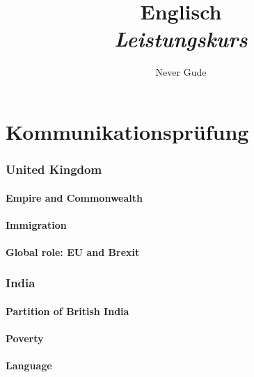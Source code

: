 \documentclass[10pt]{article}
\begin{document}
\title{{Englisch}\\{\normalsize{\itshape Leistungskurs}}}
	\author{Never Gude}
	\maketitle
	\newpage
	\pagestyle{fancynotes}

\part{Kommunikationsprüfung}
	\label{part:kompruef}
\section{United Kingdom}
	\label{sec:uk}
\subsection{Empire and Commonwealth}
	\label{ssec:uk@empire}
\subsection{Immigration}
	\label{ssec:uk@immig}
\subsection{Global role: EU and Brexit}
	\label{ssec:uk@brexit}

\section{India}
	\label{sec:india}
\subsection{Partition of British India}
	\label{ssec:india@britindia}
\subsection{Poverty}
	\label{ssec:india@poverty}
\subsection{Language}
	\label{ssec:india@language}
\end{document}
